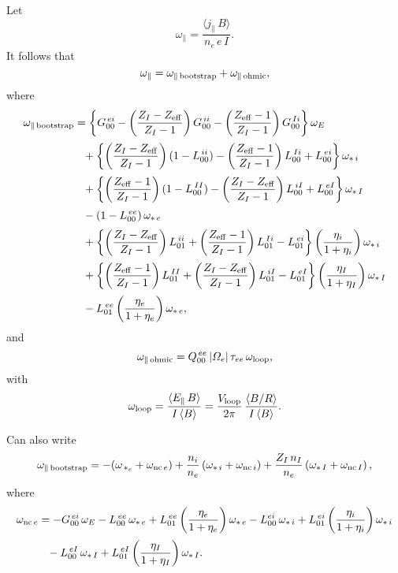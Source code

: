 \documentclass[12pt]{article}
\begin{document}
Let
\begin{equation}
\omega_\parallel = \frac{\langle j_\parallel\,B\rangle}{n_e\,e\,I}.
\end{equation}
It follows that
\begin{equation}
\omega_\parallel =\omega_{\parallel\,{\rm bootstrap}}+\omega_{\parallel\,{\rm ohmic}},
\end{equation}
where
\begin{align}
\omega_{\parallel\,{\rm bootstrap}}&=\left\{G_{00}^{\,ei}-\left(\frac{Z_I-Z_{\rm eff}}{Z_I-1}\right)G^{\,ii}_{00}- \left(\frac{Z_{\rm eff}-1}{Z_I-1}\right)G_{00}^{\,Ii}\right\}\omega_E\nonumber\\[0.5ex]
&\phantom{=} +\left\{\left(\frac{Z_I-Z_{\rm eff}}{Z_I-1}\right)(1-L^{\,ii}_{00}) - \left(\frac{Z_{\rm eff}-1}{Z_I-1}\right)L^{\,Ii}_{00}
+ L^{\,ei}_{00}\right\}\omega_{\ast\,i}\nonumber\\[0.5ex]
&\phantom{=}
+ \left\{\left(\frac{Z_{\rm eff}-1}{Z_I-1}\right)(1-L^{\,II}_{00}) - \left(\frac{Z_I-Z_{\rm eff}}{Z_I-1}\right)L^{\,iI}_{00}
+ L^{\,eI}_{00}\right\}\omega_{\ast\,I}
\nonumber\\[0.5ex]
&\phantom{=}-(1-L^{\,ee}_{00})\,\omega_{\ast\,e}\nonumber\\[0.5ex]
&\phantom{=}+\left\{\left(\frac{Z_I-Z_{\rm eff}}{Z_I-1}\right)L^{\,ii}_{01} + \left(\frac{Z_{\rm eff}-1}{Z_I-1}\right)L^{\,Ii}_{01}
- L^{\,ei}_{01}\right\}\left(\frac{\eta_i}{1+\eta_i}\right)\omega_{\ast\,i}\nonumber\\[0.5ex]
&\phantom{=}
+ \left\{\left(\frac{Z_{\rm eff}-1}{Z_I-1}\right)L^{\,II}_{01} + \left(\frac{Z_I-Z_{\rm eff}}{Z_I-1}\right)L^{\,iI}_{01}
- L^{\,eI}_{01}\right\}\left(\frac{\eta_I}{1+\eta_I}\right)\omega_{\ast\,I}
\nonumber\\[0.5ex]
&\phantom{=}-L^{\,ee}_{01}\left(\frac{\eta_e}{1+\eta_e}\right)\omega_{\ast\,e},
\end{align}
and
\begin{equation}
\omega_{\parallel\,{\rm ohmic}}= Q^{\,ee}_{00}\,|{\mit\Omega}_e|\,\tau_{ee}\,\omega_{\rm loop},
\end{equation}
with
\begin{equation}
\omega_{\rm loop} = \frac{\langle E_\parallel\,B\rangle}{I\,\langle B\rangle}= \frac{V_{\rm loop}}{2\pi}\,\frac{\langle B/R\rangle}{I\,\langle B\rangle}.
\end{equation}

Can also write
\begin{equation}
\omega_{\parallel\,{\rm bootstrap}} = -(\omega_{\,\ast_e} + \omega_{{\rm nc}\,e}) + \frac{n_i}{n_e}\left(\omega_{\ast\,i} + \omega_{{\rm nc}\,i}\right)+ \frac{Z_I\,n_I}{n_e}\left(\omega_{\ast\,I} + \omega_{{\rm nc}\,I}\right),
\end{equation}
where
\begin{align}
\omega_{{\rm nc}\,e} &= -G^{\,ei}_{00}\,\omega_E-L^{\,ee}_{00}\,\omega_{\ast\,e}+L^{\,ee}_{01}\left(\frac{\eta_e}{1+\eta_e}\right)\omega_{\ast\,e} - L_{00}^{ei}\,\omega_{\ast\,i}+L^{\,ei}_{01}\left(\frac{\eta_i}{1+\eta_i}\right)\omega_{\ast\,i}\nonumber\\[0.5ex]
&
\phantom{=}-L^{\,eI}_{00}\,\omega_{\ast\,I}+L^{\,eI}_{01}\left(\frac{\eta_I}{1+\eta_I}\right)\omega_{\ast\,I}.
\end{align}
\end{document}
